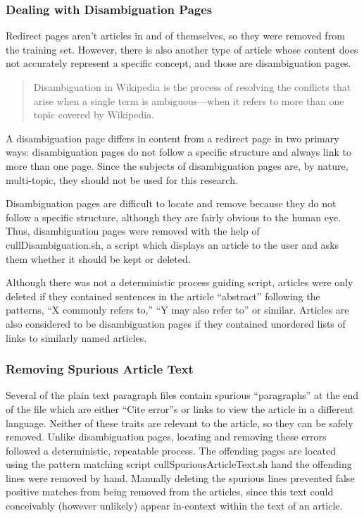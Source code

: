 \subsubsection{Dealing with Disambiguation Pages}

Redirect pages aren't articles in and of themselves, so they were removed from the training set.
However, there is also another type of article whose content does not accurately represent a specific concept, and those are disambiguation pages.

\begin{quote}
Disambiguation in Wikipedia is the process of resolving the conflicts that arise when a single term is ambiguous---when it refers to more than one topic covered by Wikipedia. \cite{wiki-disambiguation}
\end{quote}

A disambiguation page differs in content from a redirect page in two primary ways: disambiguation pages do not follow a specific structure and always link to more than one page.
Since the subjects of disambiguation pages are, by nature, multi-topic, they should not be used for this research.

Disambiguation pages are difficult to locate and remove because they do not follow a specific structure, although they are fairly obvious to the human eye.
Thus, disambiguation pages were removed with the help of cullDisambiguation.sh, a script which displays an article to the user and asks them whether it should be kept or deleted.

Although there was not a deterministic process guiding script, articles were only deleted if they contained sentences in the article ``abstract'' following the patterns, ``X commonly refers to,'' ``Y may also refer to'' or similar. Articles are also considered to be disambiguation pages if they contained unordered lists of links to similarly named articles.

\subsubsection{Removing Spurious Article Text}

Several of the plain text paragraph files contain spurious ``paragraphs'' at the end of the file which are either ``Cite error''s or links to view the article in a different language.
Neither of these traits are relevant to the article, so they can be safely removed.
Unlike disambiguation pages, locating and removing these errors followed a deterministic, repeatable process.
The offending pages are located using the pattern matching script cullSpuriousArticleText.sh hand the offending lines were removed by hand.
Manually deleting the spurious lines prevented false positive matches from being removed from the articles, since this text could conceivably (however unlikely) appear in-context within the text of an article.

